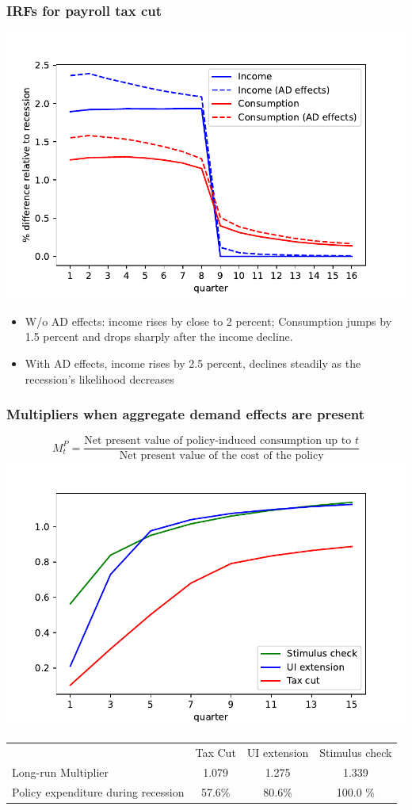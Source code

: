 \documentclass[pdflatex,aspectratio=169]{beamer}
\begin{document}
\begin{frame}
\frametitle{IRFs for payroll tax cut}
	\centering
	\includegraphics[width=0.6\linewidth]{Code/HA-Models/FromPandemicCode/Figures/recession_taxcut_relrecession}

\begin{itemize}
	\itemsep = .5\bigskipamount 
	\item W/o AD effects: income rises by close to 2 percent; Consumption jumps by 1.5 percent and drops sharply after the income decline.
	\item With AD effects, income rises by 2.5 percent, declines steadily as the recession's likelihood decreases
\end{itemize}
\end{frame}


\begin{frame}
\frametitle{Multipliers when aggregate demand effects are present}
\begin{equation*}
M^P_t = \frac{\text{Net present value of policy-induced consumption up to $t$}}{\text{Net present value of the cost of the policy}}
\end{equation*}
\centering
\includegraphics[width=0.5\linewidth]{Code/HA-Models/FromPandemicCode/Figures/Cummulative_multipliers}
\footnotesize
\begin{tabular}{@{}lccc@{}} 
	& Tax Cut    & UI extension    & Stimulus check    \\ 
	Long-run Multiplier  &1.079  & 1.275  & 1.339     \\ 
	Policy expenditure during recession  &57.6\%  & 80.6\%  & 100.0 \%    \\ 
\end{tabular}  
\normalsize 
\end{frame}
\end{document}
